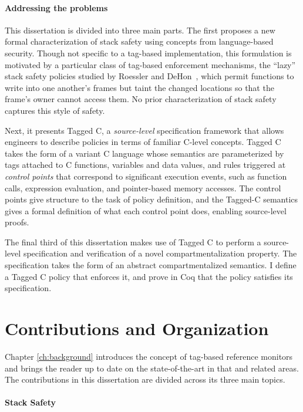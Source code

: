 \documentclass{report}
\begin{document}
\paragraph{Addressing the problems}

This dissertation is divided into three main parts. The first proposes a new formal characterization of
stack safety using concepts from language-based security. Though not specific to a tag-based
implementation, this formulation is motivated by a particular class of tag-based enforcement
mechanisms, the ``lazy'' stack safety policies studied by Roessler and DeHon~\cite{RoesslerD18},
which permit functions to write into one another's frames but taint the changed locations so that the
frame's owner cannot access them. No prior characterization of stack safety captures this style of
safety.

Next, it presents Tagged C, a \emph{source-level} specification framework that allows engineers to
describe policies in terms of familiar C-level concepts. Tagged C takes the form of a variant C language
whose semantics are parameterized by tags attached to C functions, variables and data values, and rules
triggered at \emph{control points} that correspond to significant execution events, such as function calls,
expression evaluation, and pointer-based memory accesses. The control points give structure to the task of
policy definition, and the Tagged-C semantics gives a formal definition of what each control point does,
enabling source-level proofs.

The final third of this dissertation makes use of Tagged C to perform a source-level specification and
verification of a novel compartmentalization property. The specification takes the form of
an abstract compartmentalized semantics. I define a Tagged C policy that enforces it,
and prove in Coq that the policy satisfies its specification.

\section{Contributions and Organization}

Chapter \ref{ch:background} introduces the concept of tag-based reference monitors
and brings the reader up to date on the state-of-the-art in that and related areas.
The contributions in this dissertation are divided across its three main topics.

\paragraph{Stack Safety}
\end{document}
